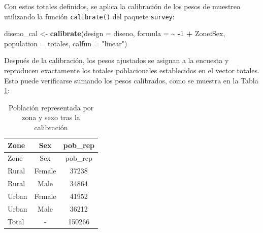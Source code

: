 \documentclass[
  spanish,
  12pt,
]{book}
\newenvironment{Shaded}{\begin{snugshade}}{\end{snugshade}}
\newcommand{\AttributeTok}[1]{\textcolor[rgb]{0.13,0.29,0.53}{#1}}
\newcommand{\DecValTok}[1]{\textcolor[rgb]{0.00,0.00,0.81}{#1}}
\newcommand{\FunctionTok}[1]{\textcolor[rgb]{0.13,0.29,0.53}{\textbf{#1}}}
\newcommand{\NormalTok}[1]{#1}
\newcommand{\OtherTok}[1]{\textcolor[rgb]{0.56,0.35,0.01}{#1}}
\newcommand{\SpecialCharTok}[1]{\textcolor[rgb]{0.81,0.36,0.00}{\textbf{#1}}}
\newcommand{\StringTok}[1]{\textcolor[rgb]{0.31,0.60,0.02}{#1}}
\begin{document}
Con estos totales definidos, se aplica la calibración de los pesos de muestreo utilizando la función \texttt{calibrate()} del paquete \texttt{survey}:

\begin{Shaded}
\begin{Highlighting}[]
\NormalTok{diseno\_cal }\OtherTok{\textless{}{-}} \FunctionTok{calibrate}\NormalTok{(}\AttributeTok{design =}\NormalTok{ diseno, }
                        \AttributeTok{formula =} \SpecialCharTok{\textasciitilde{}} \SpecialCharTok{{-}}\DecValTok{1} \SpecialCharTok{+}\NormalTok{ Zone}\SpecialCharTok{:}\NormalTok{Sex, }
                        \AttributeTok{population =}\NormalTok{ totales, }
                        \AttributeTok{calfun =} \StringTok{"linear"}\NormalTok{)  }
\end{Highlighting}
\end{Shaded}

Después de la calibración, los pesos ajustados se asignan a la encuesta y reproducen exactamente los totales poblacionales establecidos en el vector totales. Esto puede verificarse sumando los pesos calibrados, como se muestra en la Tabla \ref{tab:tab-cal-totales}:

\begin{Shaded}
\end{Shaded}

\begin{longtable}[]{@{}lcc@{}}
\caption{\label{tab:tab-cal-totales}Población representada por zona y sexo tras la calibración}\tabularnewline
\toprule\noalign{}
Zone & Sex & pob\_rep \\
\midrule\noalign{}
\endfirsthead
\toprule\noalign{}
Zone & Sex & pob\_rep \\
\midrule\noalign{}
\endhead
\bottomrule\noalign{}
\endlastfoot
Rural & Female & 37238 \\
Rural & Male & 34864 \\
Urban & Female & 41952 \\
Urban & Male & 36212 \\
Total & - & 150266 \\
\end{longtable}
\end{document}
